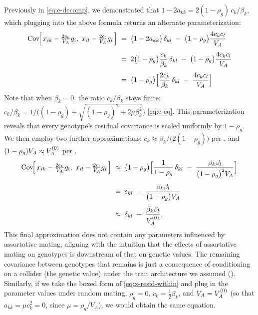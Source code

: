 \documentclass[12pt]{article}
\begin{document}
Previously in \eqref{eq:c-decomp}, we demonstrated that $1 - 2a_{kk} = 2(1-\rho_g)\,c_k/\beta_k$, which plugging into the above formula returns an alternate parameterization:
\begin{equation}\label{eq:x-resid-within-alt}
\begin{aligned}
    \mathrm{Cov}\!\Big[\,x_{ik} - \tfrac{2c_k}{V_A} g_i,\ x_{il} - \tfrac{2c_l}{V_A} g_i\,\Big]
    \;&=\; \big(1 - 2a_{kk}\big)\,\delta_{kl} \;-\; \big(1-\rho_g\big)\frac{4c_k c_l}{V_A} \\[4pt]
    \;&=\; 2\big(1-\rho_g\big)\frac{c_k}{\beta_k}\,\delta_{kl} \;-\; \big(1-\rho_g\big)\frac{4c_k c_l}{V_A} \\[4pt]
    \;&=\; \big(1-\rho_g\big)\Big[\frac{2c_k}{\beta_k}\,\delta_{kl} \;-\; \frac{4c_k c_l}{V_A}\Big]
\end{aligned}
\end{equation}
Note that when $\beta_k=0$, the ratio $c_k/\beta_k$ stays finite: $c_k/\beta_k = 1/\big((1-\rho_g) + \sqrt{(1-\rho_g)^2 + 2\mu\beta_k^2}\big)$ \eqref{eq:c-eq}.
This parameterization reveals that every genotype's residual covariance is scaled uniformly by $1-\rho_g$.
We then employ two further approximations: $c_k \approx \beta_k/\big(2(1-\rho_g)\big)$ per , and $(1-\rho_g)V_A \approx V_A^{(0)}$ per .
\begin{equation}\label{eq:x-resid-within-approx}
\begin{aligned}
    \mathrm{Cov}\!\Big[\,x_{ik} - \tfrac{2c_k}{V_A} g_i,\ x_{il} - \tfrac{2c_l}{V_A} g_i\,\Big]
    \;&\approx\; \big(1-\rho_g\big)\Big[\frac{1}{1-\rho_g}\,\delta_{kl} \;-\; \frac{\beta_k\beta_l}{\big(1-\rho_g\big)^2 V_A}\Big] \\[4pt]
    \;&=\; \delta_{kl} \;-\; \frac{\beta_k\beta_l}{\big(1-\rho_g\big)V_A} \\[4pt]
    \;&\approx\; \delta_{kl} \;-\; \frac{\beta_k\beta_l}{V_A^{(0)}} .
\end{aligned}
\end{equation}
This final approximation does not contain any parameters influenced by assortative mating, aligning with the intuition that the effects of assortative mating on genotypes is downstream of that on genetic values.
The remaining covariance between genotypes that remains is just a consequence of conditioning on a collider (the genetic value) under the trait architecture we assumed ().
Similarly, if we take the boxed form of \eqref{eq:x-resid-within} and plug in the parameter values under random mating, $\rho_g = 0$, $c_k = \tfrac12\beta_k$, and $V_A = V_A^{(0)}$ (so that $a_{kk} = \mu c_k^2 = 0$, since $\mu = \rho_g/V_A$), we would obtain the same equation.
\end{document}
